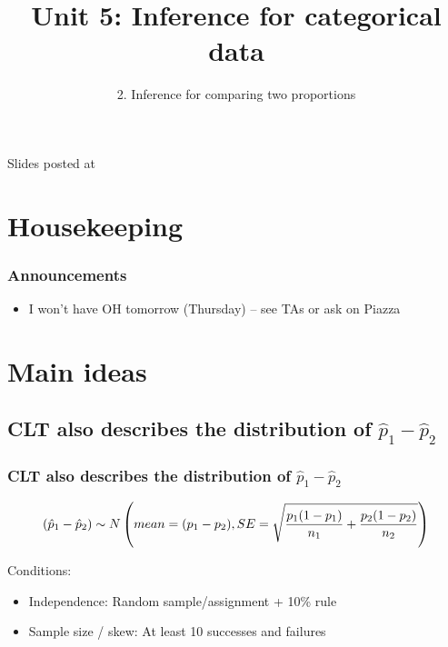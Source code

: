 \documentclass[11pt,containsverbatim,handout,xcolor=xelatex,dvipsnames,table]{beamer}
\title{Unit 5: Inference for categorical data}
\subtitle{2. Inference for comparing two proportions}
\author{\CourseName}
\date{}
\institute{\InstituteName}
\begin{document}



\begin{frame}[plain]

\titlepage

\vfill

{\scriptsize {} \hfill Slides posted at  \webURL{\CourseSite}}

\addtocounter{framenumber}{-1} 

\end{frame}


\section{Housekeeping}


\begin{frame}
\frametitle{Announcements}

\begin{itemize}

\item I won't have OH tomorrow (Thursday) -- see TAs or ask on Piazza

\end{itemize}

\end{frame}


\section{Main ideas}


\subsection{CLT also describes the distribution of $\hat{p}_1 - \hat{p}_2$}
\label{mi1}


\begin{frame}
\frametitle{CLT also describes the distribution of $\hat{p}_1 - \hat{p}_2$}

\[ (\hat{p}_1 - \hat{p}_2) \sim N \left(  mean = (p_1 - p_2), SE = \sqrt{ \frac{p_1(1-p_1)}{n_1} + \frac{p_2(1-p_2)}{n_2} }  \right) \]

Conditions:
\begin{itemize}
\item Independence: Random sample/assignment + 10\% rule
\item Sample size / skew: At least 10 successes and failures
\end{itemize}

\end{frame}
\end{document}

